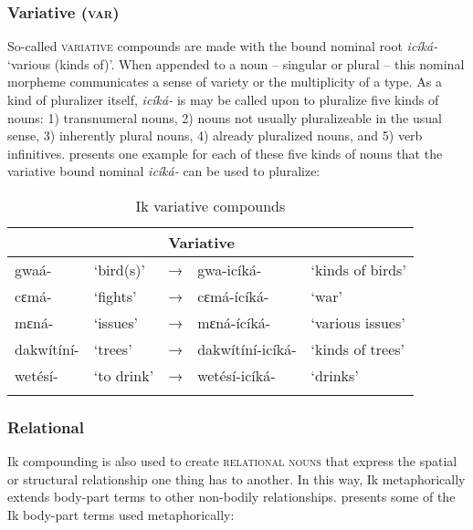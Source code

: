 \subsubsection{Variative (\textsc{var})}\label{sec:4.3.4}

So-called \textsc{variative} compounds are made with the bound nominal root \textit{icíká-} ‘various (kinds of)’. When appended to a noun – singular or plural – this nominal morpheme communicates a sense of variety or the multiplicity of a type. As a kind of pluralizer itself, \textit{icíká-} is may be called upon to pluralize five kinds of nouns: 1) transnumeral nouns, 2) nouns not usually pluralizeable in the usual sense, 3) inherently plural nouns, 4) already pluralized nouns, and 5) verb infinitives.  presents one example for each of these five kinds of nouns that the variative bound nominal \textit{icíká-} can be used to pluralize:


\begin{table}
\caption{Ik variative compounds}
\label{tab:nouns:var}


\begin{tabularx}{\textwidth}{XXXll}
\lsptoprule

\multicolumn{2}{X}{Singular/Plural} &  & \multicolumn{2}{X}{Variative}\\
\midrule
gwaá- & ‘bird(s)’ & → & gwa-icíká- & ‘kinds of birds’\\
cɛmá- & ‘fights’ & → & cɛmá-ícíká- & ‘war’\\
mɛná- & ‘issues’ & → & mɛná-ícíká- & ‘various issues’\\
dakwítíní- & ‘trees’ & → & dakwítíní-icíká- & ‘kinds of trees’\\
wetésí- & ‘to drink’ & → & wetésí-icíká- & ‘drinks’\\
\lspbottomrule
\end{tabularx}
\end{table}

\subsubsection{Relational}\label{sec:4.3.5} 

Ik compounding is also used to create \textsc{relational nouns} that express the spatial or structural relationship one thing has to another. In this way, Ik metaphorically extends body-part terms to other non-bodily relationships.  presents some of the Ik body-part terms used metaphorically:


